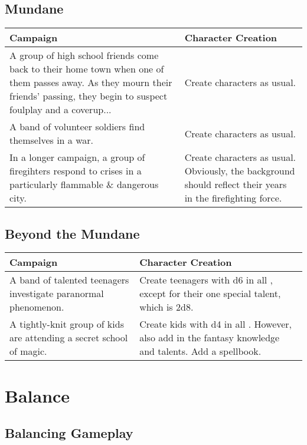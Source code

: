 \documentclass{LegrandOrangeTufteBook}
\begin{document}
\subsection*{Mundane}
\begin{center}
	\begin{xltabular}{\textwidth}{XX}
		Campaign & Character Creation \\
		\hline
		A group of high school friends come back to their home town when one of them passes away. As they mourn their friends' passing, they begin to suspect foulplay and a coverup... & Create characters as usual. \\
		A band of volunteer soldiers find themselves in a war. & Create characters as usual. \\
		In a longer campaign, a group of firegihters respond to crises in a particularly flammable \& dangerous city. & Create characters as usual. Obviously, the background should reflect their years in the firefighting force. \\
	\end{xltabular}
\end{center}


\subsection*{Beyond the Mundane}
\begin{center}
	\begin{xltabular}{\textwidth}{XX}
		Campaign & Character Creation \\
		\hline
		A band of talented teenagers investigate paranormal phenomenon. & Create teenagers with d6 in all , except for their one special talent, which is 2d8.\\
   		A tightly-knit group of kids are attending a secret school of magic. & Create kids with d4 in all . However, also add in the fantasy knowledge and talents. Add a spellbook. \\
	\end{xltabular}
\end{center}

\section*{Balance}

\subsection*{Balancing Gameplay}
\end{document}
